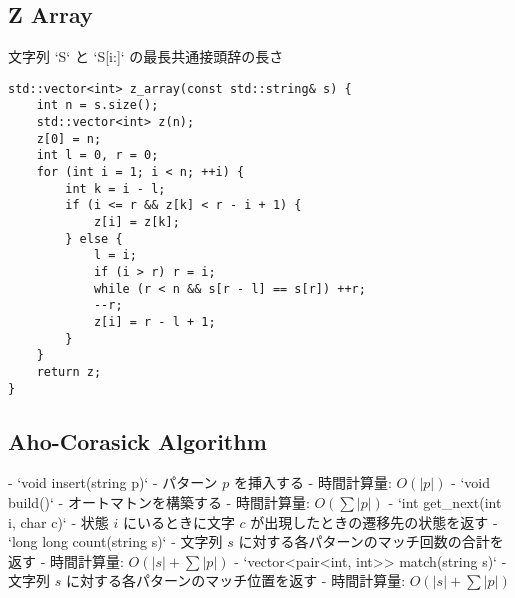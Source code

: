\subsection{Z Array}

\begin{small}
\begin{markdown}
文字列 `S` と `S[i:]` の最長共通接頭辞の長さ
\end{markdown}
\end{small}

\begin{lstlisting}
std::vector<int> z_array(const std::string& s) {
    int n = s.size();
    std::vector<int> z(n);
    z[0] = n;
    int l = 0, r = 0;
    for (int i = 1; i < n; ++i) {
        int k = i - l;
        if (i <= r && z[k] < r - i + 1) {
            z[i] = z[k];
        } else {
            l = i;
            if (i > r) r = i;
            while (r < n && s[r - l] == s[r]) ++r;
            --r;
            z[i] = r - l + 1;
        }
    }
    return z;
}
\end{lstlisting}

\subsection{Aho-Corasick Algorithm}

\begin{small}
\begin{markdown}
- `void insert(string p)`
    - パターン $p$ を挿入する
    - 時間計算量: $O(\vert p\vert)$
- `void build()`
    - オートマトンを構築する
    - 時間計算量: $O(\sum \vert p\vert)$
- `int get\_next(int i, char c)`
    - 状態 $i$ にいるときに文字 $c$ が出現したときの遷移先の状態を返す
- `long long count(string s)`
    - 文字列 $s$ に対する各パターンのマッチ回数の合計を返す
    - 時間計算量: $O(\vert s\vert + \sum \vert p\vert)$
- `vector<pair<int, int>> match(string s)`
    - 文字列 $s$ に対する各パターンのマッチ位置を返す
    - 時間計算量: $O(\vert s\vert + \sum \vert p\vert)$
\end{markdown}
\end{small}


